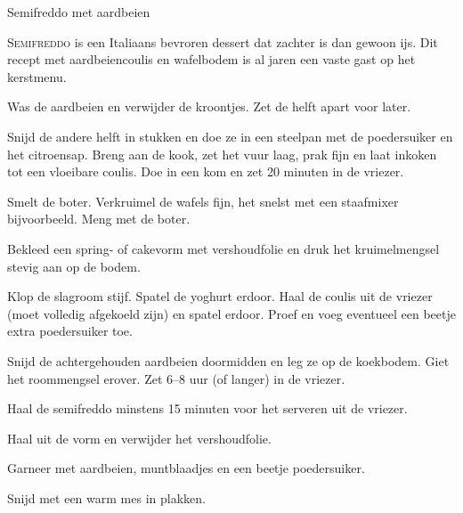 \begin{recipe}{Semifreddo met aardbeien}


\lettrine{S}{emifreddo} is een Italiaans bevroren dessert dat zachter is dan gewoon
ijs. Dit recept met aardbeiencoulis en wafelbodem is al jaren een vaste gast op het
kerstmenu.

\begin{ingredients}
\end{ingredients}

\begin{steps}
  \item Was de aardbeien en verwijder de kroontjes. Zet de helft apart voor later.
  \item Snijd de andere helft in stukken en doe ze in een steelpan met de poedersuiker en
        het citroensap. Breng aan de kook, zet het vuur laag, prak fijn en laat inkoken
        tot een vloeibare coulis. Doe in een kom en zet 20 minuten in de vriezer.
  \item Smelt de boter. Verkruimel de wafels fijn, het snelst met een staafmixer bijvoorbeeld.
        Meng met de boter. 
  \item Bekleed een spring- of cakevorm met vershoudfolie en druk het kruimelmengsel stevig aan op de bodem.
  \item Klop de slagroom stijf. Spatel de yoghurt erdoor. Haal de coulis uit de
        vriezer (moet volledig afgekoeld zijn) en spatel erdoor. Proef en voeg
        eventueel een beetje extra poedersuiker toe.
  \item Snijd de achtergehouden aardbeien doormidden en leg ze op de koekbodem.
        Giet het roommengsel erover. Zet 6--8 uur (of langer) in de vriezer.
  \item Haal de semifreddo minstens 15 minuten voor het serveren uit de vriezer.
  \item Haal uit de vorm en verwijder het vershoudfolie. 
  \item Garneer met aardbeien, muntblaadjes en een beetje poedersuiker.
  \item Snijd met een warm mes in plakken.
\end{steps}

\end{recipe}

